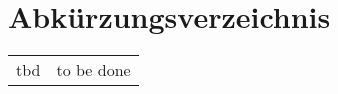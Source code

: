 
\begingroup 
\let\clearpage\relax
\let\cleardoublepage\relax
\let\cleardoublepage\relax

\chapter*{Abkürzungsverzeichnis}
\thispagestyle{empty}
\vspace{-.5em} %
\begin{tabular}{@{} p{\figurelabelwidth} @{} p{\textwidth-\figurelabelwidth}}
tbd & to be done\\

\end{tabular}       
\endgroup
\cleardoublepage
